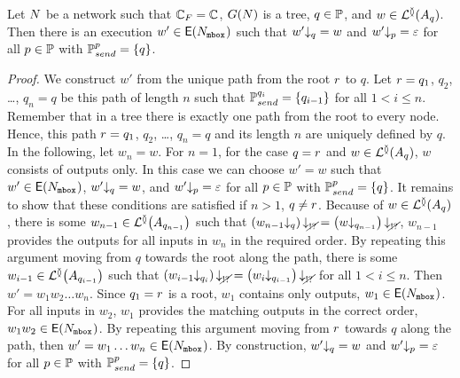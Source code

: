 \documentclass[submission,copyright,creativecommons,UKenglish]{eptcs}
\begin{document}
\begin{lemma}\label{lem:wordsoftreelanguage}
	Let $ N $ be a network such that $\mathbb{C}_F = \mathbb{C}$, $ G(N) $ is a tree, $ q \in \mathbb{P} $, and $ w \in \mathcal{L}^{\between}{\left( A_{q} \right)} $.
	Then there is an execution $ w' \in \mathsf{E}(N_{{\mathtt{mbox}}^{}}) $ such that $ w'{\downarrow_{q}} = w $ and $ w'{\downarrow_{p}} = \varepsilon $ for all $ p \in \mathbb{P} $ with $ \mathbb{P}_{send}^{p} = {\left\lbrace q \right\rbrace} $.
\end{lemma}

\begin{proof}
	We construct $ w' $ from the unique path from the root $ r $ to $ q $.
	Let $ r = q_1 $, $ q_2 $, \ldots, $ q_n = q $ be this path of length $ n $ such that $ \mathbb{P}_{send}^{q_i} = {\left\lbrace q_{i - 1} \right\rbrace} $ for all $ 1 < i \leq n $.
	Remember that in a tree there is exactly one path from the root to every node.
	Hence, this path $ r = q_1 $, $ q_2 $, \ldots, $ q_n = q $ and its length $ n $ are uniquely defined by $ q $.
	In the following, let $ w_n = w $.
	For $ n = 1 $, \ie for the case $ q = r $ and $ w \in \mathcal{L}^{\between}{\left( A_{q} \right)} $, $ w $ consists of outputs only.
	In this case we can choose $ w' = w $ such that $ w' \in \mathsf{E}(N_{{\mathtt{mbox}}^{}}) $, $ w'{\downarrow_{q}} = w $, and $ w'{\downarrow_{p}} = \varepsilon $ for all $ p \in \mathbb{P} $ with $ \mathbb{P}_{send}^{p} = {\left\lbrace q \right\rbrace} $.
	It remains to show that these conditions are satisfied if $ n > 1 $, \ie $ q \neq r $.
	Because of $ w \in \mathcal{L}^{\between}{\left( A_{q} \right)} $, there is some $ w_{n - 1} \in \mathcal{L}^{\between}{\left( A_{q_{n - 1}} \right)} $ such that $ \left( w_{n - 1}{\downarrow_{q}} \right){\downarrow_{\cancel{!?}}} = \left( w{\downarrow_{q_{n - 1}}} \right){\downarrow_{\cancel{!?}}} $, \ie $ w_{n - 1} $ provides the outputs for all inputs in $ w_n $ in the required order.
	By repeating this argument moving from $ q $ towards the root along the path, there is some $ w_{i - 1} \in \mathcal{L}^{\between}{\left( A_{q_{i - 1}} \right)} $ such that $ \left( w_{i - 1}{\downarrow_{q_i}} \right){\downarrow_{\cancel{!?}}} = \left( w_i{\downarrow_{q_{i - 1}}} \right){\downarrow_{\cancel{!?}}} $ for all $ 1 < i \leq n $.
	Then $ w' = w_1 w_2 \ldots w_n $.
	Since $ q_1 = r $ is a root, $ w_1 $ contains only outputs, \ie $ w_1 \in \mathsf{E}(N_{{\mathtt{mbox}}^{}}) $.
	For all inputs in $ w_2 $, $ w_1 $ provides the matching outputs in the correct order, \ie $ w_1w_2 \in \mathsf{E}(N_{{\mathtt{mbox}}^{}}) $.
	By repeating this argument moving from $ r $ towards $ q $ along the path, then $ w' = w_1 \ldots w_n \in \mathsf{E}(N_{{\mathtt{mbox}}^{}}) $.
	By construction, $ w'{\downarrow_{q}} = w $ and $ w'{\downarrow_{p}} = \varepsilon $ for all $ p \in \mathbb{P} $ with $ \mathbb{P}_{send}^{p} = {\left\lbrace q \right\rbrace} $.
\end{proof}
\end{document}
